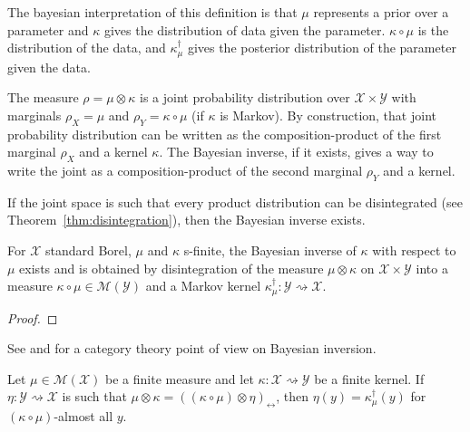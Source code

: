 The bayesian interpretation of this definition is that $\mu$ represents a prior over a parameter and $\kappa$ gives the distribution of data given the parameter. $\kappa \circ \mu$ is the distribution of the data, and $\kappa_\mu^\dagger$ gives the posterior distribution of the parameter given the data.

The measure $\rho = \mu \otimes \kappa$ is a joint probability distribution over $\mathcal X \times \mathcal Y$ with marginals $\rho_X = \mu$ and $\rho_Y = \kappa \circ \mu$ (if $\kappa$ is Markov). By construction, that joint probability distribution can be written as the composition-product of the first marginal $\rho_X$ and a kernel $\kappa$. The Bayesian inverse, if it exists, gives a way to write the joint as a composition-product of the second marginal $\rho_Y$ and a kernel. 

If the joint space is such that every product distribution can be disintegrated (see Theorem~\ref{thm:disintegration}), then the Bayesian inverse exists.

\begin{lemma}
  \label{lem:exists_bayesInv}
  \leanok
  For $\mathcal X$ standard Borel, $\mu$ and $\kappa$ s-finite, the Bayesian inverse of $\kappa$ with respect to $\mu$ exists and is obtained by disintegration of the measure $\mu \otimes \kappa$ on $\mathcal X \times \mathcal Y$ into a measure $\kappa \circ \mu \in \mathcal M(\mathcal Y)$ and a Markov kernel $\kappa_\mu^\dagger : \mathcal Y \rightsquigarrow \mathcal X$.
\end{lemma}

\begin{proof}\leanok
{}

\end{proof}


See \cite{clerc2017pointless} and \cite{dahlqvist2018borel} for a category theory point of view on Bayesian inversion.

\begin{lemma}
  \label{lem:eq_bayesInv_of_compProd_eq}
  \leanok
  Let $\mu \in \mathcal M(\mathcal X)$ be a finite measure and let $\kappa : \mathcal X \rightsquigarrow \mathcal Y$ be a finite kernel.
  If $\eta : \mathcal Y \rightsquigarrow \mathcal X$ is such that $\mu \otimes \kappa = ((\kappa \circ \mu) \otimes \eta)_\leftrightarrow$, then $\eta(y) = \kappa_\mu^\dagger(y)$ for $(\kappa \circ \mu)$-almost all $y$.
\end{lemma}

